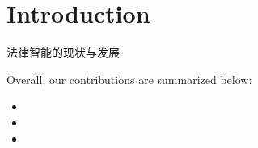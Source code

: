 \section{Introduction}
\label{intro}
 法律智能的现状与发展

Overall, our contributions are summarized below:
\begin{itemize}
    \item 
    \item 
    \item 
\end{itemize}



